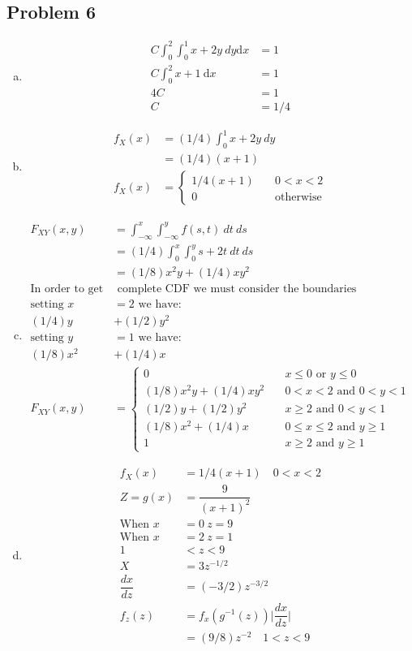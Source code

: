 \documentclass{article}
\newcommand{\dx}{\mathrm{d}x}
\begin{document}
\begin{flushleft}
\section*{Problem 6}
\begin{enumerate}[(a)]
\item
\begin{align*}
C\int_{0}^{2}\int_{0}^{1}x+2y \ dy \dx&=1\\
C\int_0^2 x+1 \ \dx&=1\\
4C&=1\\
C&=1/4
\end{align*}
\item
\begin{align*}
f_X(x)&=(1/4)\int_{0}^{1}x+2y \ dy\\
&=(1/4)(x+1)\\
f_X(x)&=\begin{cases}
1/4(x+1) \quad & 0<x<2\\
0 \quad & \text{otherwise}
\end{cases}
\end{align*}
\item
\begin{align*}
F_{XY}(x,y)&=\int_{-\infty}^{x}\int_{-\infty}^{y}f(s,t) \ dt \ ds\\
&=(1/4)\int_{0}^{x}\int_{0}^{y}s+2t \ dt \ ds\\
&=(1/8)x^2y+(1/4)xy^2\\
\text{In order to get the} &\text{ complete CDF we must consider the boundaries}\\
\text{setting } x&=2 \text{ we have:}\\
(1/4)y&+(1/2)y^2\\
\text{setting } y&=1 \text{ we have:}\\
(1/8)x^2&+(1/4)x\\
F_{XY}(x,y)&=\begin{cases}
0 \quad & x\leq 0 \text{ or } y\leq 0\\
(1/8)x^2y+(1/4)xy^2 \quad & 0<x<2 \text{ and } 0<y<1\\
(1/2)y+(1/2)y^2 \quad & x\geq 2 \text{ and } 0<y<1\\
(1/8)x^2+(1/4)x \quad & 0 \leq x \leq 2 \text{ and } y\geq 1\\
1 \quad & x \geq 2 \text{ and } y \geq 1
\end{cases}
\end{align*}
\item 
\begin{align*}
f_X(x)&=1/4(x+1) \quad  0<x<2\\
Z=g(x)&=\dfrac{9}{(x+1)^2}\\
\text{When } x&=0 \ z=9\\
\text{When } x&=2 \ z=1\\
1&<z<9\\
X&=3z^{-1/2}\\
\dfrac{dx}{dz}&=(-3/2)z^{-3/2}\\
f_z(z)&=f_x(g^{-1}(z))\bigg|\dfrac{dx}{dz}\bigg|\\
&=(9/8)z^{-2} \quad 1<z<9
\end{align*}
\end{enumerate}
\pagebreak

\end{flushleft}
\end{document}
